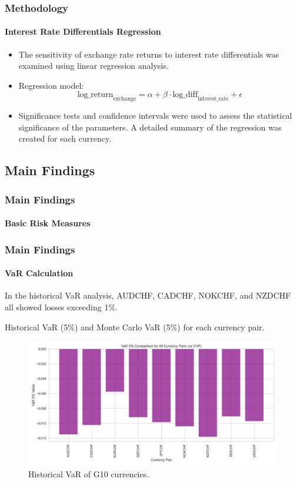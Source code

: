 \documentclass[10pt]{beamer}
\begin{document}
\begin{frame}
\frametitle{Methodology}
\framesubtitle{Interest Rate Differentials Regression}
\begin{itemize}
    \item The sensitivity of exchange rate returns to interest rate differentials was examined using linear regression analysis. 
    \item Regression model: \[
    \text{log\_return}_{\text{exchange}} = \alpha + \beta \cdot \text{log\_diff}_{\text{interest\_rate}} + \epsilon
    \]
    \item Significance tests and confidence intervals were used to assess the statistical significance of the parameters. A detailed summary of the regression was created for each currency.
\end{itemize}
\end{frame}
\begin{frame}
\section{Main Findings}
\frametitle{Main Findings}
\framesubtitle{Basic Risk Measures}

\end{frame}
\begin{frame}
\frametitle{Main Findings}
\framesubtitle{VaR Calculation}
In the historical VaR analysis, AUDCHF, CADCHF, NOKCHF, and NZDCHF all showed losses exceeding 1\%. 
\begin{table}[h]
\centering
\caption{\footnotesize Historical VaR (5\%) and Monte Carlo VaR (5\%) for each currency pair.} 
\label{tab:var_results}
\end{table}
\begin{figure}[h]
    \centering   \includegraphics[width=0.48\linewidth]{reports/figures/var_5_percent_comparison_plot.png}
    \caption{\footnotesize Historical VaR of G10 currencies.}
    \label{fig:historical_VaR}
\end{figure}
\end{frame}
\end{document}
